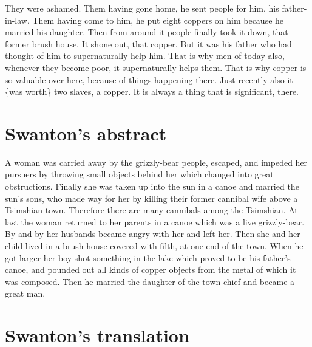 \begin{pairs}
\begin{Rightside}
They were ashamed.
\pend
\pstart
{}Them having gone home, he sent people for him, his father-in-law.
Them having come to him, he put eight coppers on him because he married his daughter.
Then from around it people finally took it down, that former brush house.
It shone out, that copper.
But it was his father who had thought of him to supernaturally help him.
That is why men of today also, whenever they become poor, it supernaturally helps them.
That is why copper is so valuable over here, because of things happening there.
Just recently also it \{was worth\} two slaves, a copper.
It is always a thing that is significant, there.
\pend
\endnumbering
\end{Rightside}
\end{pairs}
\Columns

\vspace{1\baselineskip}

\section{Swanton’s abstract}\label{sec:89-swanton-abstract}

A woman was carried away by the grizzly-bear people, escaped, and impeded her pursuers by throwing small objects behind her which changed into great obstructions.
Finally she was taken up into the sun in a canoe and married the sun’s sons, who made way for her by killing their former cannibal wife above a Tsimshian town.
Therefore there are many cannibals among the Tsimshian.
At last the woman returned to her parents in a canoe which was a live grizzly-bear.
By and by her husbands became angry with her and left her.
Then she and her child lived in a brush house covered with filth, at one end of the town.
When he got larger her boy shot something in the lake which proved to be his father’s canoe, and pounded out all kinds of copper objects from the metal of which it was composed.
Then he married the daughter of the town chief and became a great man.

\section{Swanton’s translation}\label{sec:89-swanton-translation}

